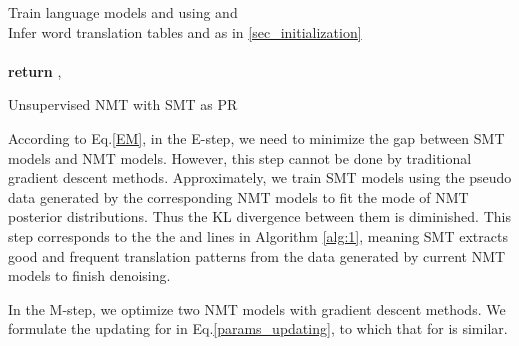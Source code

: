 \documentclass[letterpaper]{article} \usepackage{aaai19}  \usepackage{times}  \usepackage{helvet}  \usepackage{courier}  \usepackage{url}  \usepackage{graphicx}  \usepackage{amsmath}
\newcommand{\newref}[1]{Eq.\eqref{#1}}
\begin{document}
\begin{algorithm}[!htb]
\small
{}
		\nl Train language models  and  using  and \\
		\nl Infer word translation tables  and  as in \ref{sec_initialization} \\ 
        \nl \\
        \nl \textbf{return}  , 
\caption{Unsupervised NMT with SMT as PR} 
\label{alg:1}
\end{algorithm}

According to \newref{EM}, in the E-step, we need to minimize the gap between SMT models and NMT models. However, this step cannot be done by traditional gradient descent methods. Approximately, we train SMT models using the pseudo data generated by the corresponding NMT models to fit the mode of NMT posterior distributions. Thus the KL divergence between them is diminished. This step corresponds to the the  and  lines in Algorithm \ref{alg:1}, meaning SMT extracts good and frequent translation patterns from the data generated by current NMT models to finish denoising. 

In the M-step, we optimize two NMT models with gradient descent methods. We formulate the updating for  in \newref{params_updating}, to which that for  is similar.
\end{document}
